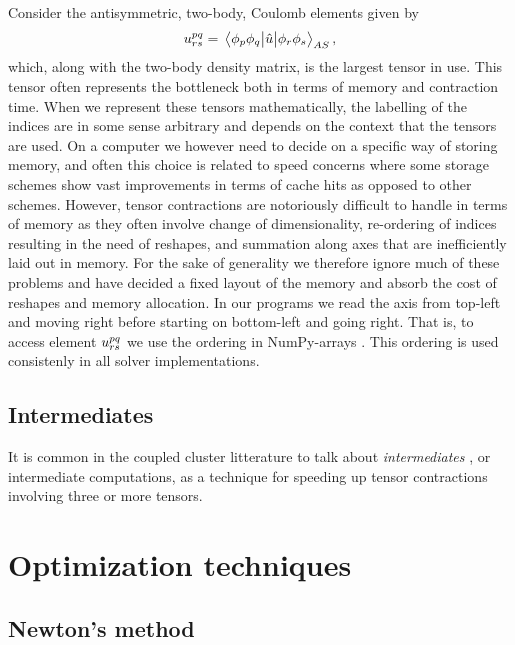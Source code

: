         Consider the antisymmetric, two-body, Coulomb elements given by
        \begin{align}
            u^{pq}_{rs}
            = \mel{\phi_p\phi_q}{\hat{u}}{\phi_r\phi_s}_{AS},
        \end{align}
        which, along with the two-body density matrix, is the largest tensor in
        use.
        This tensor often represents the bottleneck both in terms of memory and
        contraction time.
        When we represent these tensors mathematically, the labelling of the
        indices are in some sense arbitrary and depends on the context that the
        tensors are used.
        On a computer we however need to decide on a specific way of storing
        memory, and often this choice is related to speed concerns where some
        storage schemes show vast improvements in terms of cache hits as opposed
        to other schemes.
        However, tensor contractions are notoriously difficult to handle in
        terms of memory as they often involve change of dimensionality,
        re-ordering of indices resulting in the need of reshapes, and summation
        along axes that are inefficiently laid out in memory.
        For the sake of generality we therefore ignore much of these problems
        and have decided a fixed layout of the memory and absorb the cost of
        reshapes and memory allocation.
        In our programs we read the axis from top-left and moving right before
        starting on bottom-left and going right.
        That is, to access element $u^{pq}_{rs}$ we use the ordering
         in NumPy-arrays \cite{numpy}.
        This ordering is used consistenly in all solver implementations.

        \subsection{Intermediates}
            It is common in the coupled cluster litterature to talk about
            \emph{intermediates} \cite{hjorth2017advanced, gauss1995coupled}, or
            intermediate computations, as a technique for speeding up tensor
            contractions involving three or more tensors.

    \section{Optimization techniques}
        \subsection{Newton's method}
